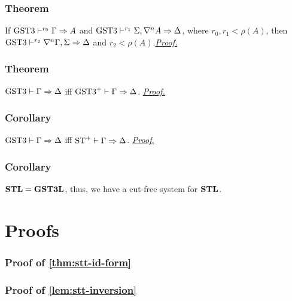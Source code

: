 \documentclass[a4paper, 12pt]{paper}
\begin{document}
\section{Theorem}\label{thm:gstt-cut-reduction}
If $\text{GST3} \vdash^{r_0} \Gamma \Rightarrow A$ and $\text{GST3} \vdash^{r_1} \Sigma , \nabla^n A \Rightarrow \Delta$, where $r_0, r_1 < \rho(A)$, then $\text{GST3} \vdash^{r_2} \nabla^n \Gamma, \Sigma \Rightarrow \Delta$ and $r_2 < \rho(A)$.\hyperref[pr:gstt-cut-reduction]{\emph{Proof.}}



\section{Theorem}\label{thm:gstt-eq-gsttp} $\text{GST3} \vdash \Gamma \Rightarrow \Delta$ iff $\text{GST3}^+ \vdash \Gamma \Rightarrow \Delta$. \hyperref[pr:gstt-eq-gsttp]{\emph{Proof.}}



\section{Corollary}\label{thm:gstt-eq-stp} $\text{GST3} \vdash \Gamma \Rightarrow \Delta$ iff $\text{ST}^+ \vdash \Gamma \Rightarrow \Delta$. \hyperref[pr:gstt-eq-stp]{\emph{Proof.}}



\section{Corollary} $\mathbf{STL} = \mathbf{GST3L}$, thus, we have a cut-free system for $\mathbf{STL}$.


\pagebreak

\part*{Proofs}
\setcounter{section}{0}

\section{Proof of \ref{thm:stt-id-form}}\label{pr:stt-id-form}



\section{Proof of \ref{lem:stt-inversion}}\label{pr:stt-inversion} 
\end{document}
